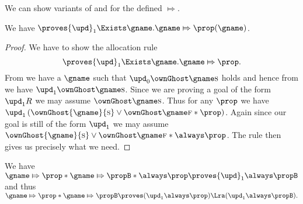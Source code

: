 We can show variants of  and  for the defined $\Mapsto$.
\begin{lem}
  \label{lem:counterexample-invariants-saved-prop-alloc}
We have
  \(\proves {\upd}_1 \Exists \gname. \gname \Mapsto \prop(\gname)\).
\end{lem}
\begin{proof}
  We have to show the allocation rule \[\proves {\upd}_1 \Exists \gname. \gname \Mapsto \prop.\]
    From  we have a $\gname$ such that ${\upd}_0 \ownGhost \gname \starttoken$ holds and hence from  we have ${\upd}_1\ownGhost\gname \starttoken$.
    Since we are proving a goal of the form ${\upd}_1 R$ we may assume $\ownGhost \gname \starttoken$.
    Thus for any $\prop$ we have ${\upd}_1\left(\ownGhost{\gname}{\starttoken} \lor \ownGhost \gname \finishtoken * \prop\right)$.
    Again since our goal is still of the form ${\upd}_1$ we may assume $\ownGhost{\gname}{\starttoken} \lor \ownGhost \gname \finishtoken * \always \prop$.
    The rule  then gives us precisely what we need.
 \end{proof}

%
\begin{lem}
\label{lem:counterexample-invariants-saved-prop-agree}
We have
  \(
  \gname \Mapsto \prop * \gname \Mapsto \propB * \always \prop \proves {\upd}_1 \always \propB
  \)
and thus
  \(
  \gname \Mapsto \prop * \gname \Mapsto \propB \proves ({\upd}_1 \always \prop) \Lra ({\upd}_1 \always \propB).
  \)
\end{lem}

